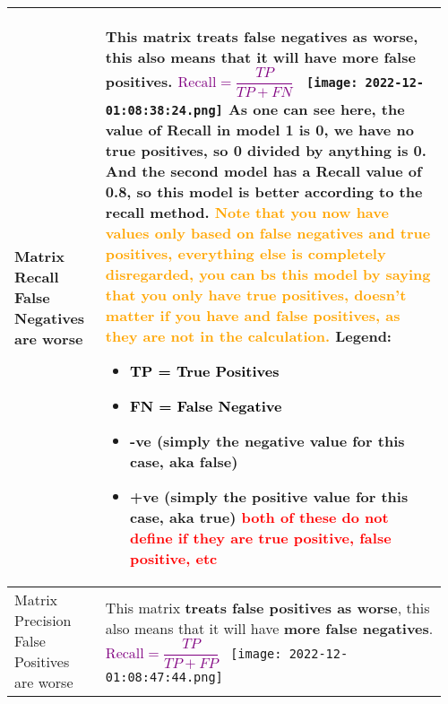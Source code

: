 \documentclass[main.tex,fontsize=8pt,paper=a4,paper=portrait,DIV=calc,]{scrartcl}
\begin{document}
\begin{table}[ht!]
\begin{tabular}{|m{0.2\linewidth}|m{0.755\linewidth}|}
\hline
Matrix Recall \textcolor{OliveGreen}{False Negatives are worse}&
This matrix \textbf{treats false negatives as worse}, this also means that it will have \textbf{more false positives}.\newline
\large \textcolor{purple}{\( \text{Recall} = \dfrac{TP}{TP + FN} \)}\newline
\normalsize \, \newline
\texttt{[image: 2022-12-01:08:38:24.png]}\newline
As one can see here, the value of Recall in model 1 is 0, we have no true positives, so 0 divided by anything is 0.\newline
And the second model has a Recall value of 0.8, so this model is better according to the recall method.\newline
\textcolor{orange}{Note that you now have values only based on false negatives and true positives, everything else is completely disregarded,\newline
you can bs this model by saying that you only have true positives, doesn't matter if you have and false positives, as they are not in the calculation.}\newline
Legend:\newline
\begin{itemize}
\item \textcolor{black}{TP = True Positives}
\item \textcolor{black}{FN = False Negative}
\item -ve (simply the negative value for this case, aka false)
\item +ve (simply the positive value for this case, aka true)\newline
  \textcolor{red}{both of these do not define if they are true positive, false positive, etc}
  \vspace{-3mm}
\end{itemize} \\
\hline
Matrix Precision \textcolor{OliveGreen}{False Positives are worse}&
This matrix \textbf{treats false positives as worse}, this also means that it will have \textbf{more false negatives}.\newline
\large \textcolor{purple}{\( \text{Recall} = \dfrac{TP}{TP + FP} \)}\newline
\normalsize \, \newline
\texttt{[image: 2022-12-01:08:47:44.png]}\newline

\end{tabular}
\end{table}
\end{document}
